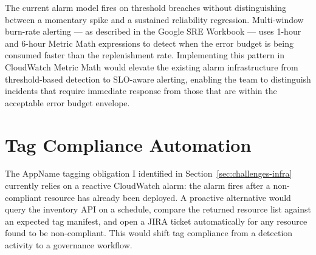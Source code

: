 The current alarm model fires on threshold breaches without distinguishing
between a momentary spike and a sustained reliability regression. Multi-window
burn-rate alerting --- as described in the Google SRE Workbook --- uses
1-hour and 6-hour Metric Math expressions to detect when the error budget is
being consumed faster than the replenishment rate. Implementing this pattern
in CloudWatch Metric Math would elevate the existing alarm infrastructure from
threshold-based detection to SLO-aware alerting, enabling the team to
distinguish incidents that require immediate response from those that are
within the acceptable error budget envelope.


\section{Tag Compliance Automation}
\label{sec:future_tag_compliance}

The AppName tagging obligation I identified in Section~\ref{sec:challenges-infra} currently
relies on a reactive CloudWatch alarm: the alarm fires after a non-compliant
resource has already been deployed. A proactive alternative would query the
inventory API on a schedule, compare the returned resource list against an
expected tag manifest, and open a JIRA ticket automatically for any resource
found to be non-compliant. This would shift tag compliance from a detection
activity to a governance workflow.

\FloatBarrier

